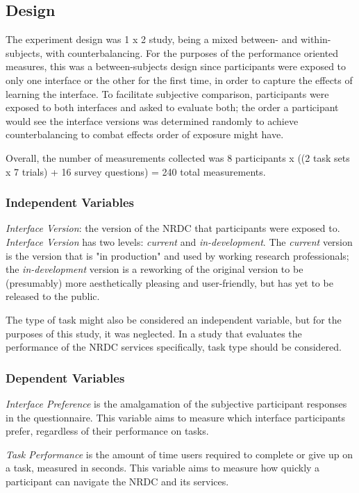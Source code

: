 \documentclass{acm_proc_article-sp}
\begin{document}
%
\subsection{Design}
The experiment design was 1 x 2 study, being a mixed between- and within-subjects, with counterbalancing. For the purposes of the performance oriented measures, this was a between-subjects design since participants were exposed to only one interface or the other for the first time, in order to capture the effects of learning the interface. To facilitate subjective comparison, participants were exposed to both interfaces and asked to evaluate both; the order a participant would see the interface versions was determined randomly to achieve counterbalancing to combat effects order of exposure might have.

Overall, the number of measurements collected was 8 participants x ((2 task sets x 7 trials) + 16 survey questions) = 240 total measurements.

%
\subsubsection{Independent Variables}
\emph{Interface Version}: the version of the NRDC that participants were exposed to. \emph{Interface Version} has two levels: \emph{current} and \emph{in-development}. The \emph{current} version is the version that is "in production" and used by working research professionals; the \emph{in-development} version is a reworking of the original version to be (presumably) more aesthetically pleasing and user-friendly, but has yet to be released to the public.

The type of task might also be considered an independent variable, but for the purposes of this study, it was neglected. In a study that evaluates the performance of the NRDC services specifically, task type should be considered.

%
\subsubsection{Dependent Variables}
\emph{Interface Preference} is the amalgamation of the subjective participant responses in the questionnaire. This variable aims to measure which interface participants prefer, regardless of their performance on tasks.

\emph{Task Performance} is the amount of time users required to complete or give up on a task, measured in seconds. This variable aims to measure how quickly a participant can navigate the NRDC and its services.
\end{document}
